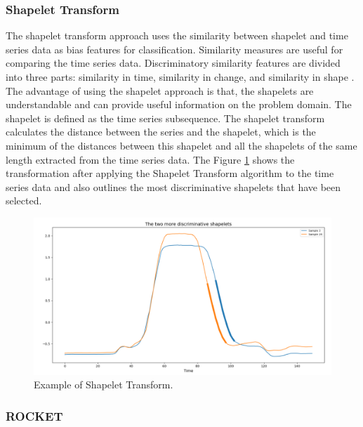 \subsubsection*{Shapelet Transform}
The shapelet transform approach uses the similarity between shapelet and time 
series data as bias features for classification. Similarity measures are useful for comparing the time series data. Discriminatory similarity features are divided into three parts: similarity in time, similarity in change, and similarity in shape \cite{HILLS201305}. The advantage of using the shapelet approach is that, the shapelets are understandable and can provide useful information on the problem domain. The shapelet is defined as the time series subsequence. The shapelet transform calculates the distance between the series and the shapelet, which is the minimum of the distances between this shapelet and all the shapelets of the same length extracted from the time series data. The Figure \ref{fig:OverviewShapeletTransform} shows the transformation after applying the Shapelet Transform algorithm to the time series data and also outlines the most discriminative shapelets that have been selected.

\begin{figure}[ht]
	\centering
	\includegraphics[width=\textwidth]{gfx/Overview of shapelet transform.png}
	\captionsetup{justification=centering}
	\caption{Example of Shapelet Transform.}
	\label{fig:OverviewShapeletTransform}
\end{figure}

\subsubsection*{ROCKET}

